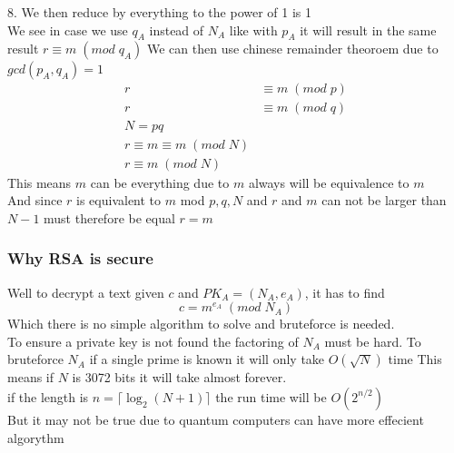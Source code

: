 \documentclass[12pt, a4paper]{article}
\begin{document}
					8. We then reduce by everything to the power of 1 is 1\\
					We see in case we use $q_A$ instead of $N_A$ like with $p_A$ it will result in the same result $r\equiv m\;(mod\;q_A)$
					We can then use chinese remainder theoroem due to $gcd(p_A,q_A)=1$\\
					\begin{align*}
						r&\equiv m\;(mod\;p)\\
						r&\equiv m\;(mod\;q)\\
						N=pq\\
						r\equiv m\equiv m\;(mod\;N)\\
						r\equiv m\;(mod\;N)
					\end{align*}
					This means $m$ can be everything due to $m$ always will be equivalence to $m$\\
					And since $r$ is equivalent to $m$ mod $p,q,N$ and $r$ and $m$ can not be larger than $N-1$ must therefore be equal $r=m$
				\subsubsection{Why RSA is secure}
					Well to decrypt a text given $c$ and $PK_A=(N_A,e_A)$, it has to find
						$$c=m^{e_A}\;(mod\;N_A)$$
					Which there is no simple algorithm to solve and bruteforce is needed.\\[4mm]
					To ensure a private key is not found the factoring of $N_A$ must be hard.
					To bruteforce $N_A$ if a single prime is known it will only take $O(\sqrt{N})$ time
					This means if $N$ is 3072 bits it will take almost forever.\\
					if the length is $n=\lceil \log_2(N+1)\rceil$ the run time will be $O(2^{n/2})$\\
					But it may not be true due to quantum computers can have more effecient algorythm\\
\end{document}
